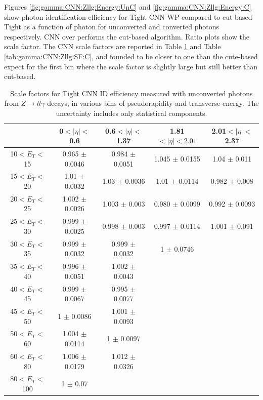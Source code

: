 Figures \ref{fig:gamma:CNN:Zllg:Energy:UnC} and \ref{fig:gamma:CNN:Zllg:Energy:C} show photon identification efficiency for Tight CNN WP compared to cut-based Tight as a function of photon \eT for unconverted and converted photons respectively. CNN over performs the cut-based algorithm. Ratio plots show the scale factor. The CNN scale factors are reported in Table \ref{tab:gamma:CNN:Zllg:SF:UnC} and Table \ref{tab:gamma:CNN:Zllg:SF:C}, and founded to be closer to one than the cute-based expect for the first \eT bin where the scale factor is slightly large but still better than cut-based. 
\begin{table}[htbp]
    \centering
   \begin{tabular}{ccccc}
   \hline\hline
     & 0$<|\eta|<$0.6 & 0.6$<|\eta|<$1.37 & 1.81$<|\eta|<2.01$  & 2.01$<|\eta|<$2.37 \\
    \hline
10$<E_T<$15   & 0.965 $\pm$ 0.0046 & 0.984 $\pm$ 0.0051 & 1.045 $\pm$ 0.0155 & 1.04 $\pm$ 0.011\\
15$<E_T<$20   & 1.01 $\pm$  0.0032 & 1.03 $\pm$ 0.0036  & 1.01 $\pm$ 0.0114 & 0.982 $\pm$ 0.008 \\
20$<E_T<$25   & 1.002 $\pm$ 0.0026 & 1.003 $\pm$ 0.003  & 0.980 $\pm$ 0.0099 & 0.992 $\pm$ 0.0093\\
25$<E_T<$30   & 0.999 $\pm$ 0.0025 & 0.998 $\pm$ 0.003  & 0.997 $\pm$ 0.0114 & 1.001 $\pm$ 0.091\\
30$<E_T<$35   & 0.999 $\pm$ 0.0032 & 0.999 $\pm$ 0.0032 & 1     $\pm$ 0.0746 & \\
35$<E_T<$40   & 0.996 $\pm$ 0.0051 & 1.002 $\pm$ 0.0043 &                    & \\
40$<E_T<$45   & 0.999 $\pm$ 0.0067 & 0.995 $\pm$ 0.0077 &                    & \\
45$<E_T<$50   & 1     $\pm$ 0.0086 & 1.001 $\pm$ 0.0093 &                    & \\
50$<E_T<$60   & 1.004 $\pm$ 0.0114 & 1     $\pm$ 0.0097 &                    & \\
60$<E_T<$80   & 1.006 $\pm$ 0.0179 & 1.012 $\pm$ 0.0326 &                    & \\
80$<E_T<$100  & 1     $\pm$ 0.07   &                    &                    & \\
\hline\hline
\end{tabular}
\caption{Scale factors for Tight CNN ID efficiency measured with unconverted photons from $Z\rightarrow ll\gamma$ decays, in various bins of pseudorapidity and transverse energy. The uncertainty includes only statistical components.}
\label{tab:gamma:CNN:Zllg:SF:UnC}
\end{table}



